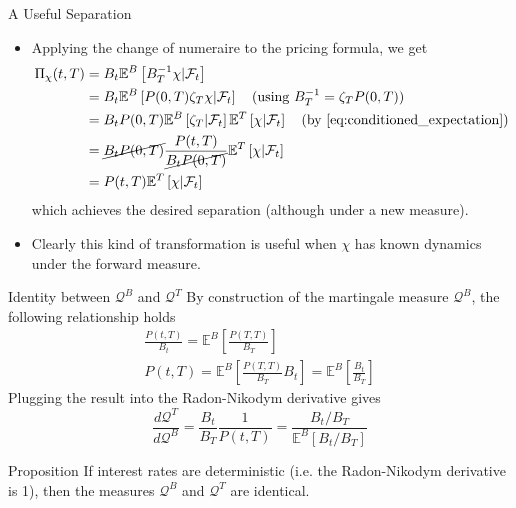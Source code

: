 \documentclass{beamer}
\begin{document}
\begin{frame}{A Useful Separation}
  \begin{itemize}
  \item<1-> Applying the change of numeraire to the pricing formula, we get
    \begin{equation*}
      \begin{aligned}
	\Pi_\chi(t,T) & = B_t\mathbb{E}^B\left[B^{-1}_T\chi|\mathcal{F}_t\right] \\
	& = B_t\mathbb{E}^B\left[P(0,T)\zeta_T\chi|\mathcal{F}_t\right]\quad\text{(using } B_T^{-1} = \zeta_TP(0,T))\\
	& = B_tP(0,T)\mathbb{E}^B\left[\zeta_T|\mathcal{F}_t\right]\mathbb{E}^T\left[\chi|\mathcal{F}_t\right]\quad\text{(by \cref{eq:conditioned_expectation})}\\
	& = \cancel{B_tP(0,T)}\frac{P(t,T)}{\cancel{B_tP(0,T)}}\mathbb{E}^T\left[\chi|\mathcal{F}_t\right] \\
	& = P(t,T)\mathbb{E}^T\left[\chi|\mathcal{F}_t\right] \\
      \end{aligned}
    \end{equation*}
    which achieves the desired separation (although under a new measure).
  \item<2-> Clearly this kind of transformation is useful when $\chi$ has known dynamics under the forward measure.
  \end{itemize}
\end{frame}

\begin{frame}{Identity between $\mathcal{Q}^B$ and $\mathcal{Q}^T$}
  By construction of the martingale measure $\mathcal{Q}^B$, the following relationship holds
  \begin{equation*}
    \begin{gathered}
      \frac{P(t,T)}{B_t}=\mathbb{E}^B\left[\frac{P(T,T)}{B_T}\right]\\[0.3cm]
      P(t,T)=\mathbb{E}^B\left[\frac{P(T,T)}{B_T}B_t\right] = \mathbb{E}^B\left[\frac{B_t}{B_T}\right]
    \end{gathered}
  \end{equation*}
	\pause
  Plugging the result into the Radon-Nikodym derivative gives
  \begin{equation*}
    \frac{d\mathcal{Q}^T}{d\mathcal{Q}^B} = \frac{B_t}{B_T}\frac{1}{P(t,T)} =\frac{B_t/B_T}{\mathbb{E}^B[B_t/B_T]}
  \end{equation*}
	\pause
  \begin{block}{Proposition}
    If interest rates are deterministic (i.e. the Radon-Nikodym derivative is 1), then the measures $\mathcal{Q}^B$ and $\mathcal{Q}^T$ are identical.
  \end{block}
\end{frame}
\end{document}
